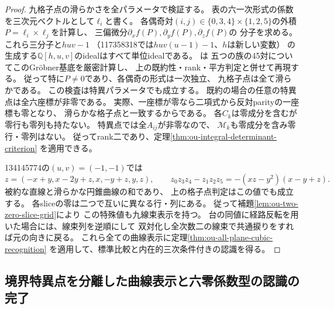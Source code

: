 \begin{proof}
九格子点の滑らかさを全パラメータで検証する。
表の六一次形式の係数を三次元ベクトルとして$\ell_i$と書く。
各偶奇対$(i,j)\in\{0,3,4\}\times\{1,2,5\}$の外積
$P=\ell_i\times\ell_j$を計算し、
三偏微分$\partial_x f(P),\partial_y f(P),\partial_z f(P)$の
分子を求める。これら三分子と$huv-1$
（117358318では$huv(u-1)-1$、$h$は新しい変数）
の生成する$\mathbb Q[h,u,v]$のidealはすべて単位idealである。
は
五つの族の45対についてこのGröbner基底を厳密計算し、
上の既約性・rank・平方判定と併せて再現する。
従って特に$P\ne0$であり、各偶奇の形式は一次独立、
九格子点は全て滑らかである。
この検査は特異パラメータでも成立する。
既約の場合の任意の特異点は全六座標が非零である。
実際、一座標が零なら二項式から反対parityの一座標も零となり、
滑らかな格子点と一致するからである。
各$C_k$は零成分を含むが零行も零列も持たない。
特異点では全$A_{ij}$が非零なので、
$\mathscr M_k$も零成分を含み零行・零列はない。
従ってrank二であり、定理\ref{thm:ou-integral-determinant-criterion}
を適用できる。

134145774の$(u,v)=(-1,-1)$では
\[
 z=(-x+y,x-2y+z,x,-y+z,y,z),\qquad
 z_0z_3z_4-z_1z_2z_5=-(xz-y^2)(x-y+z).
\]
被約な直線と滑らかな円錐曲線の和であり、
上の格子点判定はこの値でも成立する。
各sliceの零は二つで互いに異なる行・列にある。
従って補題\ref{lem:ou-two-zero-slice-grid}により
この特殊値も九線束表示を持つ。
台の同値に経路反転を用いた場合には、線束列を逆順にして
双対化し全次数二の線束で共通捩りをすれば元の向きに戻る。
これら全ての曲線表示に定理\ref{thm:ou-all-plane-cubic-recognition}
を適用して、標準比較と内在的三次条件付きの認識を得る。
\end{proof}

\subsection{境界特異点を分離した曲線表示と六零係数型の認識の完了}
\label{subsec:ou-six-zero-expanded-curve}

